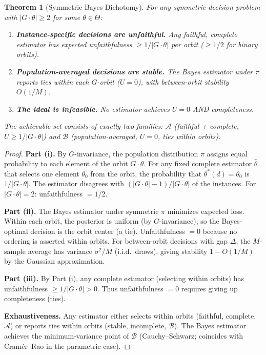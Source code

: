 \documentclass{article}
\newtheorem{theorem}{Theorem}
\begin{document}
\begin{theorem}[Symmetric Bayes Dichotomy]
\label{thm:bayes-dichotomy}
For any symmetric decision problem with $|G \cdot \theta| \geq 2$ for some $\theta \in \Theta$:
\begin{enumerate}
    \item[(i)] \textbf{Instance-specific decisions are unfaithful.} Any faithful, complete estimator has expected unfaithfulness $\geq 1/|G \cdot \theta|$ per orbit ($\geq 1/2$ for binary orbits).
    \item[(ii)] \textbf{Population-averaged decisions are stable.} The Bayes estimator under $\pi$ reports ties within each $G$-orbit ($U = 0$), with between-orbit stability $O(1/M)$.
    \item[(iii)] \textbf{The ideal is infeasible.} No estimator achieves $U = 0$ AND completeness.
\end{enumerate}
The achievable set consists of exactly two families: $\mathcal{A}$ (faithful + complete, $U \geq 1/|G \cdot \theta|$) and $\mathcal{B}$ (population-averaged, $U = 0$, ties within orbits).
\end{theorem}

\begin{proof}
\textbf{Part (i).} By $G$-invariance, the population distribution $\pi$ assigns equal probability to each element of the orbit $G \cdot \theta$. For any fixed complete estimator $\hat\theta$ that selects one element $\theta_0$ from the orbit, the probability that $\theta^*(d) = \theta_0$ is $1/|G \cdot \theta|$. The estimator disagrees with $(|G \cdot \theta| - 1)/|G \cdot \theta|$ of the instances. For $|G \cdot \theta| = 2$: unfaithfulness $= 1/2$.

\textbf{Part (ii).} The Bayes estimator under symmetric $\pi$ minimizes expected loss. Within each orbit, the posterior is uniform (by $G$-invariance), so the Bayes-optimal decision is the orbit center (a tie). Unfaithfulness $= 0$ because no ordering is asserted within orbits. For between-orbit decisions with gap $\Delta$, the $M$-sample average has variance $\sigma^2/M$ (i.i.d.\ draws), giving stability $1 - O(1/M)$ by the Gaussian approximation.

\textbf{Part (iii).} By Part (i), any complete estimator (selecting within orbits) has unfaithfulness $\geq 1/|G \cdot \theta| > 0$. Thus unfaithfulness $= 0$ requires giving up completeness (ties).

\textbf{Exhaustiveness.} Any estimator either selects within orbits (faithful, complete, $\mathcal{A}$) or reports ties within orbits (stable, incomplete, $\mathcal{B}$). The Bayes estimator achieves the minimum-variance point of $\mathcal{B}$ (Cauchy--Schwarz; coincides with Cram\'er--Rao in the parametric case).
\end{proof}
\end{document}
